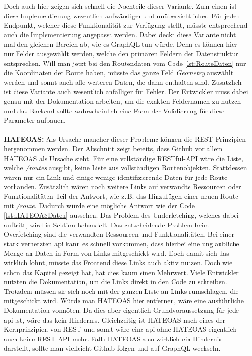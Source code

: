 Doch auch hier zeigen sich schnell die Nachteile dieser Variante. Zum einen ist diese Implementierung wesentlich aufwändiger und unübersichtlicher. Für jeden Endpunkt, welcher diese Funktionalität zur Verfügung stellt, müsste entsprechend auch die Implementierung angepasst werden. Dabei deckt diese Variante nicht mal den gleichen Bereich ab, wie es GraphQL tun würde. Denn es können hier nur Felder ausgewählt werden, welche den primären Feldern der Datenstruktur entsprechen. Will man jetzt bei den Routendaten vom Code \ref{lst:RouteDaten} nur die Koordinaten der Route haben, müsste das ganze Feld \textit{Geometry} auswählt werden und somit auch alle weiteren Daten, die darin enthalten sind. Zusätzlich ist diese Variante auch wesentlich anfälliger für Fehler. Der Entwickler muss dabei genau mit der Dokumentation arbeiten, um die exakten Feldernamen zu nutzen und das Backend sollte wahrscheinlich eine Form der Validierung für diese Parameter aufbauen.\\
\\
\textbf{HATEOAS:} Als Ursache mancher dieser Probleme können die REST-Prinzipien hergenommen werden. Der Abschnitt  zeigt bereits, dass Github vor allem \ac{HATEOAS} als Ursache sieht. Für eine vollständige RESTful-API wäre die Liste, welche \textit{/routes} ausgibt, keine Liste aus vollständigen Routenobjekten. Stattdessen wären nur ein Link und einige wenige identifizierende Daten für jede Route vorhanden. Zusätzlich wären noch weitere Links auf verwandte Ressourcen oder Funktionalitäten Teil der Antwort, wie z.\,B. das Hinzufügen einer neuen Route mit \textit{/route}. Dadurch würde eine mögliche Antwort wie der Code \ref{lst:HATEOASDaten} aussehen. Das Problem des Underfetching, welches dabei auftritt, wird in Sektion  behandelt. Das entscheidende Problem beim Overfetching sind die verwandten Ressourcen und Funktionalitäten. Bei einer stark vernetzten \ac{api} kann es schnell vorkommen, dass hierbei eine unglaubliche Menge an Daten in Form von Links mitgeschickt wird. Doch damit sich das wirklich lohnt, müsste das Frontend diese Links auch aktiv nutzen. Doch wie schon das Kapitel  gezeigt hat, hat dies kaum einen Mehrwert. Viele Entwickler nutzten die Dokumentation, um die Links direkt in den Code zu schreiben. Trotzdem müssen sie sich noch mit der ganzen Liste an Links rumschlagen, die mitgeschickt wird. Würde man \ac{HATEOAS} hier entfernen, wäre eine ausführliche Dokumentation vonnöten. Da dies aber eigentlich Grundvoraussetzung für jede \ac{api} ist, wäre das kein Hindernis. Gleichzeitig ist \ac{HATEOAS} nach \parencite{Fielding2008} eines der Kernprinzipien von \ac{REST} und somit wäre eine \ac{api} ohne \ac{HATEOAS} eigentlich auch keine REST-API mehr. Falls \ac{HATEOAS} also wirklich ein Hindernis darstellt, sollte man vielleicht Github folgen und auf GraphQL wechseln.


